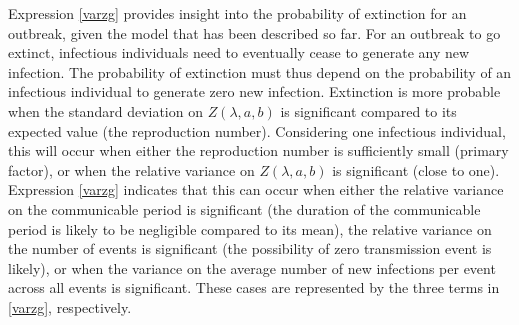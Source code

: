 \documentclass[sr]{drdc-report}
\begin{document}
Expression \eqref{varzg} provides insight into the probability of extinction for an outbreak, given the model that has been described so far.
For an outbreak to go extinct, infectious individuals need to eventually cease to generate any new infection.
The probability of extinction must thus depend on the probability of an infectious individual to generate zero new infection.
Extinction is more probable when the standard deviation on $Z(\lambda,a,b)$ is significant compared to its expected value (the reproduction number).
Considering one infectious individual, this will occur when either the reproduction number is sufficiently small (primary factor), or when the relative variance on $Z(\lambda,a,b)$ is significant (close to one). 
Expression \eqref{varzg} indicates that this can occur when either the relative variance on the communicable period is significant (the duration of the communicable period is likely to be negligible compared to its mean), the relative variance on the number of events is significant (the possibility of zero transmission event is likely), or when the variance on the average number of new infections per event across all events is significant.
These cases are represented by the three terms in \eqref{varzg}, respectively.
\end{document}
